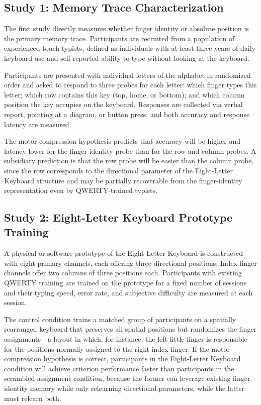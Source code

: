 \documentclass[12pt,a4paper]{article}
\theoremstyle{plain}
\theoremstyle{definition}
\theoremstyle{remark}
\begin{document}
\subsection{Study 1: Memory Trace Characterization}

The first study directly measures whether finger identity or absolute position
is the primary memory trace. Participants are recruited from a population of
experienced touch typists, defined as individuals with at least three years of
daily keyboard use and self-reported ability to type without looking at the
keyboard.

Participants are presented with individual letters of the alphabet in randomized
order and asked to respond to three probes for each letter: which finger types
this letter; which row contains this key (top, home, or bottom); and which
column position the key occupies on the keyboard. Responses are collected via
verbal report, pointing at a diagram, or button press, and both accuracy and
response latency are measured.

The motor compression hypothesis predicts that accuracy will be higher and
latency lower for the finger identity probe than for the row and column probes.
A subsidiary prediction is that the row probe will be easier than the column
probe, since the row corresponds to the directional parameter of the Eight-Letter
Keyboard structure and may be partially recoverable from the finger-identity
representation even by QWERTY-trained typists.

\subsection{Study 2: Eight-Letter Keyboard Prototype Training}

A physical or software prototype of the Eight-Letter Keyboard is constructed
with eight primary channels, each offering three directional positions. Index
finger channels offer two columns of three positions each. Participants with
existing QWERTY training are trained on the prototype for a fixed number of
sessions and their typing speed, error rate, and subjective difficulty are
measured at each session.

The control condition trains a matched group of participants on a spatially
rearranged keyboard that preserves all spatial positions but randomizes the
finger assignments---a layout in which, for instance, the left little finger
is responsible for the positions normally assigned to the right index finger.
If the motor compression hypothesis is correct, participants in the Eight-Letter
Keyboard condition will achieve criterion performance faster than participants in
the scrambled-assignment condition, because the former can leverage existing
finger identity memory while only relearning directional parameters, while the
latter must relearn both.
\end{document}
